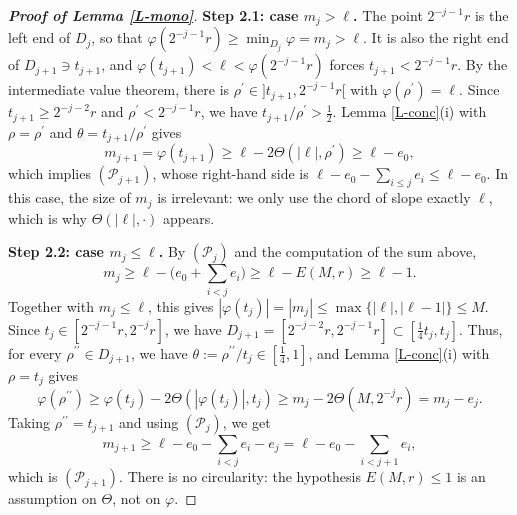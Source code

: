 \documentclass[reqno,12pt]{amsart}
\numberwithin{equation}{section}
\theoremstyle{remark}
\begin{document}
\begin{proof}[\bf Proof of Lemma \ref{L-mono}]
\smallskip

{\bf Step 2.1: case \boldmath$m_j>\ell$\unboldmath.} The point $2^{-j-1}r$ is the left end of $D_j$, so that $\varphi(2^{-j-1}r)\geq\min_{D_j}\varphi=m_j>\ell$. It is also the right end of $D_{j+1}\ni t_{j+1}$, and $\varphi(t_{j+1})<\ell<\varphi(2^{-j-1}r)$ forces $t_{j+1}<2^{-j-1}r$. By the intermediate value theorem, there is $\rho^\prime\in]t_{j+1},2^{-j-1}r[$ with $\varphi(\rho^\prime)=\ell$. Since $t_{j+1}\geq2^{-j-2}r$ and $\rho^\prime<2^{-j-1}r$, we have $t_{j+1}/\rho^\prime>\frac12$. Lemma \ref{L-conc}(i) with $\rho=\rho^\prime$ and $\theta=t_{j+1}/\rho^\prime$ gives
\begin{equation*}
m_{j+1}=\varphi(t_{j+1})\geq\ell-2\Theta(|\ell|,\rho^\prime)\geq\ell-e_0,
\end{equation*}
which implies $(\mathcal{P}_{j+1})$, whose right-hand side is $\ell-e_0-\sum_{i\leq j}e_i\leq\ell-e_0$. In this case, the size of $m_j$ is irrelevant: we only use the chord of slope exactly $\ell$, which is why $\Theta(|\ell|,\cdot)$ appears.

\smallskip

{\bf Step 2.2: case \boldmath$m_j\leq\ell$\unboldmath.} By $(\mathcal{P}_j)$ and the computation of the sum above,
\begin{equation*}
m_j\geq\ell-\Big(e_0+\sum_{i<j}e_i\Big)\geq\ell-E(M,r)\geq\ell-1.
\end{equation*}
Together with $m_j\leq\ell$, this gives $|\varphi(t_j)|=|m_j|\leq\max\{|\ell|,|\ell-1|\}\leq M$. Since $t_j\in[2^{-j-1}r,2^{-j}r]$, we have $D_{j+1}=[2^{-j-2}r,2^{-j-1}r]\subset[\frac14t_j,t_j]$. Thus, for every $\rho^{\prime\prime}\in D_{j+1}$, we have $\theta:=\rho^{\prime\prime}/t_j\in[\frac14,1]$, and Lemma \ref{L-conc}(i) with $\rho=t_j$ gives
\begin{equation*}
\varphi(\rho^{\prime\prime})\geq\varphi(t_j)-2\Theta(|\varphi(t_j)|,t_j)\geq m_j-2\Theta(M,2^{-j}r)=m_j-e_j.
\end{equation*}
Taking $\rho^{\prime\prime}=t_{j+1}$ and using $(\mathcal{P}_j)$, we get
\begin{equation*}
m_{j+1}\geq\ell-e_0-\sum_{i<j}e_i-e_j=\ell-e_0-\sum_{i<j+1}e_i,
\end{equation*}
which is $(\mathcal{P}_{j+1})$. There is no circularity: the hypothesis $E(M,r)\leq1$ is an assumption on $\Theta$, not on $\varphi$.

\medskip


\end{proof}
\end{document}
